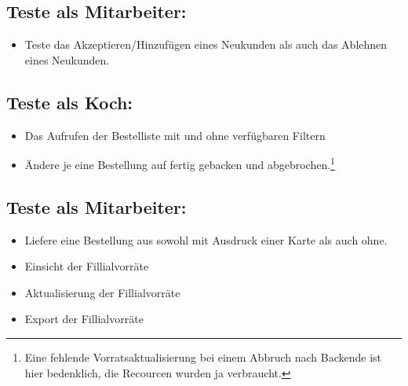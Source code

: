 \documentclass[a4paper]{report}
\begin{document}
\subsection*{Teste als Mitarbeiter:}
\begin{itemize}
 \item Teste das Akzeptieren/Hinzufügen eines Neukunden als auch das Ablehnen eines Neukunden. 
\end{itemize}

\subsection*{Teste als Koch:}
\begin{itemize}
 \item Das Aufrufen der Bestelliste mit und ohne verfügbaren Filtern
 \item Ändere je eine Bestellung auf fertig gebacken und abgebrochen.\footnote{Eine fehlende Vorratsaktualisierung bei einem Abbruch nach Backende ist hier bedenklich, die Recourcen wurden ja verbraucht.}
\end{itemize}


\subsection*{Teste als Mitarbeiter:}
\begin{itemize}
 \item Liefere eine Bestellung aus sowohl mit Ausdruck einer Karte als auch ohne.
 \item Einsicht der Fillialvorräte
 \item Aktualisierung der Fillialvorräte
 \item Export der Fillialvorräte
\end{itemize}
\end{document}
